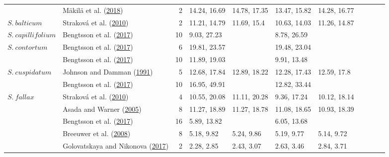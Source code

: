 \documentclass[
  12pt,
]{article}
\begin{document}
\begin{table}[H]
{\begin{tabular}[t]{llrllllllll}
 & Mäkilä et al. (\protect\hyperlink{ref-Makila.2018}{2018}) & 2 & 14.24, 16.69 & 14.78, 17.35 & 13.47, 15.82 & 14.28, 16.77 &  &  &  & \\

\multirow[t]{-4}{*}{\raggedright\arraybackslash $S.~balticum$} & Straková et al. (\protect\hyperlink{ref-Strakova.2010}{2010}) & 2 & 11.21, 14.79 & 11.69, 15.4 & 10.63, 14.03 & 11.26, 14.87 &  &  &  & \\
\cmidrule{1-11}
$S.~capillifolium$ & Bengtsson et al. (\protect\hyperlink{ref-Bengtsson.2017}{2017}) & 10 & 9.03, 27.23 &  & 8.78, 26.59 &  &  &  &  & \\
\cmidrule{1-11}
$S.~contortum$ & Bengtsson et al. (\protect\hyperlink{ref-Bengtsson.2017}{2017}) & 6 & 19.81, 23.57 &  & 19.48, 23.04 &  &  &  &  & \\
\cmidrule{1-11}
 & Bengtsson et al. (\protect\hyperlink{ref-Bengtsson.2017}{2017}) & 10 & 11.89, 19.03 &  & 9.91, 13.48 &  &  &  &  & \\

\multirow[t]{-2}{*}{\raggedright\arraybackslash $S.~cuspidatum$} & Johnson and Damman (\protect\hyperlink{ref-Johnson.1991}{1991}) & 5 & 12.68, 17.84 & 12.89, 18.22 & 12.28, 17.43 & 12.59, 17.8 &  &  &  & \\
\cmidrule{1-11}
 & Bengtsson et al. (\protect\hyperlink{ref-Bengtsson.2017}{2017}) & 10 & 16.95, 49.91 &  & 12.82, 33.44 &  &  &  &  & \\

\multirow[t]{-2}{*}{\raggedright\arraybackslash $S.~fallax$} & Straková et al. (\protect\hyperlink{ref-Strakova.2010}{2010}) & 4 & 10.55, 20.08 & 11.11, 20.28 & 9.36, 17.24 & 10.12, 18.14 &  &  &  & \\
\cmidrule{1-11}
 & Asada and Warner (\protect\hyperlink{ref-Asada.2005b}{2005}) & 8 & 11.27, 18.89 & 11.27, 18.78 & 11.08, 18.65 & 10.93, 18.39 &  &  &  & \\

 & Bengtsson et al. (\protect\hyperlink{ref-Bengtsson.2017}{2017}) & 16 & 5.89, 13.82 &  & 6.05, 13.68 &  &  &  &  & \\

 & Breeuwer et al. (\protect\hyperlink{ref-Breeuwer.2008}{2008}) & 8 & 5.18, 9.82 & 5.24, 9.86 & 5.19, 9.77 & 5.14, 9.72 &  &  &  & \\

 & Golovatskaya and Nikonova (\protect\hyperlink{ref-Golovatskaya.2017}{2017}) & 2 & 2.28, 2.85 & 2.43, 3.07 & 2.63, 3.46 & 2.84, 3.71 &  &  &  & \\


\end{tabular}}
\end{table}
\end{document}
